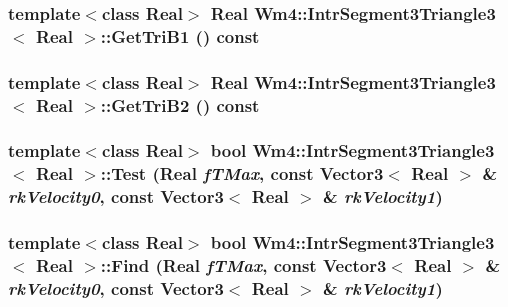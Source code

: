 \subsubsection{\setlength{\rightskip}{0pt plus 5cm}template$<$class Real$>$ Real {\bf Wm4::Intr\-Segment3Triangle3}$<$ Real $>$::Get\-Tri\-B1 () const}\label{classWm4_1_1IntrSegment3Triangle3_ffc0a298a3a668c7052fb9b29f70d754}


\subsubsection{\setlength{\rightskip}{0pt plus 5cm}template$<$class Real$>$ Real {\bf Wm4::Intr\-Segment3Triangle3}$<$ Real $>$::Get\-Tri\-B2 () const}\label{classWm4_1_1IntrSegment3Triangle3_e94f5488046b1331cf02f6a78618ffa4}


\subsubsection{\setlength{\rightskip}{0pt plus 5cm}template$<$class Real$>$ bool {\bf Wm4::Intr\-Segment3Triangle3}$<$ Real $>$::Test (Real {\em f\-TMax}, const {\bf Vector3}$<$ Real $>$ \& {\em rk\-Velocity0}, const {\bf Vector3}$<$ Real $>$ \& {\em rk\-Velocity1})\hspace{0.3cm}{\tt  [virtual]}}\label{classWm4_1_1IntrSegment3Triangle3_ec56edb6e1a5e4a3eab61b90d21d3180}


\subsubsection{\setlength{\rightskip}{0pt plus 5cm}template$<$class Real$>$ bool {\bf Wm4::Intr\-Segment3Triangle3}$<$ Real $>$::Find (Real {\em f\-TMax}, const {\bf Vector3}$<$ Real $>$ \& {\em rk\-Velocity0}, const {\bf Vector3}$<$ Real $>$ \& {\em rk\-Velocity1})\hspace{0.3cm}{\tt  [virtual]}}\label{classWm4_1_1IntrSegment3Triangle3_14b6137039fc467396424e8b5e6716aa}


